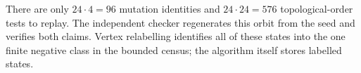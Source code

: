 There are only $24\cdot4=96$ mutation identities and $24\cdot24=576$ topological-order tests to replay. The independent checker regenerates this orbit from the seed and verifies both claims. Vertex relabelling identifies all of these states into the one finite negative class in the bounded census; the algorithm itself stores labelled states.
